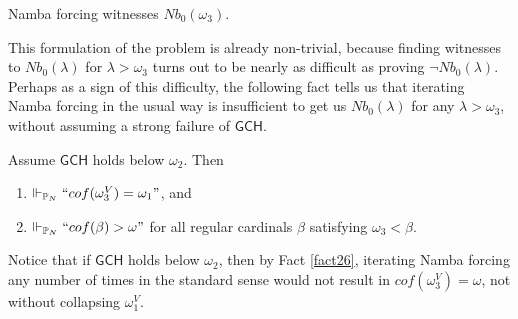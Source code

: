 \documentclass[12pt]{article}
\numberwithin{equation}{section}
\begin{document}
\begin{fact}
Namba forcing witnesses $Nb_0(\omega_3)$.
\end{fact}

This formulation of the problem is already non-trivial, because finding witnesses to $Nb_0(\lambda)$ for $\lambda > \omega_3$ turns out to be nearly as difficult as proving $\neg Nb_0(\lambda)$. Perhaps as a sign of this difficulty, the following fact tells us that iterating Namba forcing in the usual way is insufficient to get us $Nb_0(\lambda)$ for any $\lambda > \omega_3$, without assuming a strong failure of $\mathsf{GCH}$. 

\begin{fact}\label{fact26}
Assume $\mathsf{GCH}$ holds below $\omega_2$. Then 
\begin{enumerate}[label=(\arabic*)]
    \item\label{fact261} $\Vdash_{\mathbb{P}_{N}} ``cof(\omega_3^V) = \omega_1"$, and
    \item $\Vdash_{\mathbb{P}_{N}} ``cof(\beta) > \omega"$ for all regular cardinals $\beta$ satisfying $\omega_3 < \beta$.
\end{enumerate}
\end{fact}

Notice that if $\mathsf{GCH}$ holds below $\omega_2$, then by Fact \ref{fact26}, iterating Namba forcing any number of times in the standard sense would not result in $cof(\omega_3^V) = \omega$, not without collapsing $\omega_1^V$.
\end{document}

